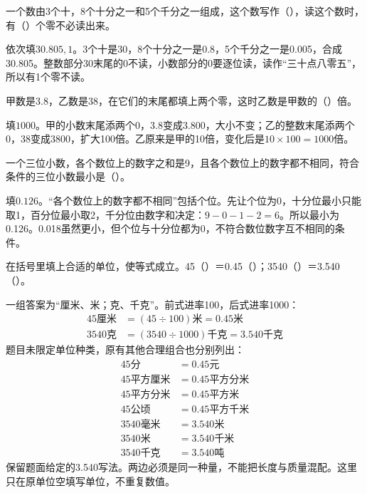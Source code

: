 一个数由3个十，8个十分之一和5个千分之一组成，这个数写作（\hspace{1.8em}），读这个数时，有（\hspace{1.8em}）个零不必读出来。\par
\begin{BookAnswer}
依次填\(30.805,1\)。3个十是30，8个十分之一是0.8，5个千分之一是0.005，合成30.805。整数部分30末尾的0不读，小数部分的0要逐位读，读作“三十点八零五”，所以有1个零不读。
\end{BookAnswer}

甲数是3.8，乙数是38，在它们的末尾都填上两个零，这时乙数是甲数的（\hspace{1.8em}）倍。\par
\begin{BookAnswer}
填\(1000\)。甲的小数末尾添两个0，3.8变成3.800，大小不变；乙的整数末尾添两个0，38变成3800，扩大100倍。乙原来是甲的10倍，变化后是\(10\times100=1000\)倍。
\end{BookAnswer}

一个三位小数，各个数位上的数字之和是9，且各个数位上的数字都不相同，符合条件的三位小数最小是（\hspace{1.8em}）。\par
\begin{BookAnswer}
填\(0.126\)。“各个数位上的数字都不相同”包括个位。先让个位为0，十分位最小只能取1，百分位最小取2，千分位由数字和决定：\(9-0-1-2=6\)。所以最小为0.126。0.018虽然更小，但个位与十分位都为0，不符合数位数字互不相同的条件。
\end{BookAnswer}

在括号里填上合适的单位，使等式成立。45（\hspace{1.8em}）＝0.45（\hspace{1.8em}）；3540（\hspace{1.8em}）＝3.540（\hspace{1.8em}）。\par
\begin{BookAnswer}
一组答案为“厘米、米；克、千克”。前式进率100，后式进率1000：\[\begin{aligned}45\text{厘米}&=(45\div100)\text{米}=0.45\text{米}\\3540\text{克}&=(3540\div1000)\text{千克}=3.540\text{千克}\end{aligned}\]题目未限定单位种类，原有其他合理组合也分别列出：\[\begin{aligned}45\text{分}&=0.45\text{元}\\45\text{平方厘米}&=0.45\text{平方分米}\\45\text{平方分米}&=0.45\text{平方米}\\45\text{公顷}&=0.45\text{平方千米}\\3540\text{毫米}&=3.540\text{米}\\3540\text{米}&=3.540\text{千米}\\3540\text{千克}&=3.540\text{吨}\end{aligned}\]保留题面给定的3.540写法。两边必须是同一种量，不能把长度与质量混配。这里只在原单位空填写单位，不重复数值。
\end{BookAnswer}

